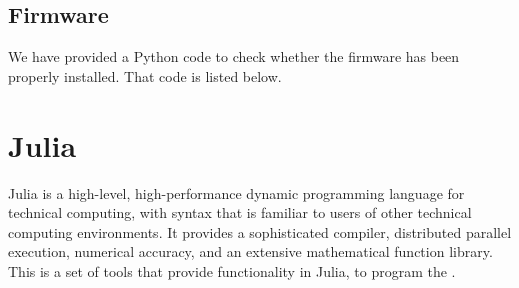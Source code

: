 

\subsection{Firmware}
\lstset{style=mystyle}
\label{sec:test-firmware-python}
We have provided a Python code to check whether the firmware has been
properly installed.  That code is listed below.

\begin{pycode}
      \label{py:test-firmware}
      
\end{pycode}








\section{Julia}
\label{sec:julia-start}
Julia is a high-level, high-performance dynamic programming language for
technical computing, with syntax that is familiar to users of other technical
computing environments. It provides a sophisticated compiler, distributed
parallel execution, numerical accuracy, and an extensive mathematical function
library. This is a set of tools that provide functionality in Julia, to program the
\arduino. 


